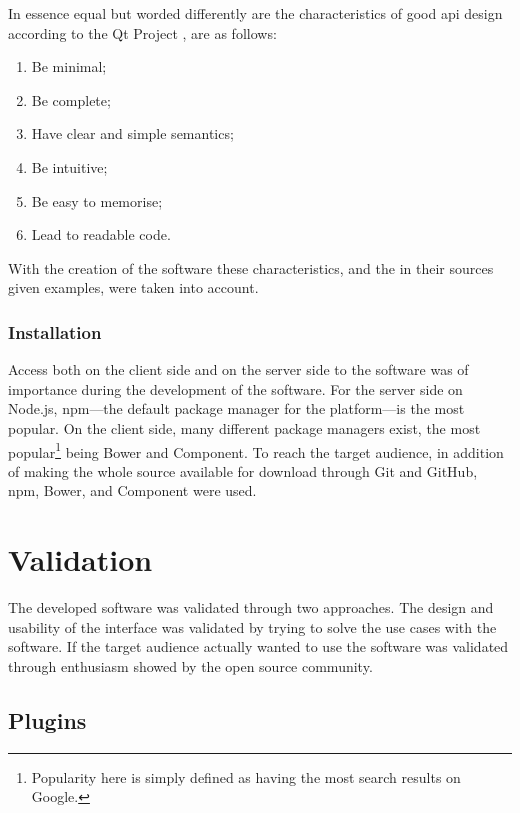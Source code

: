 \begin{enumerate}
In essence equal but worded differently are the characteristics of good
\gls{api} design according to the Qt Project
\autocite{qt-project.org-api-design-principles}, are as follows:

\begin{enumerate}
\item
  Be minimal;
\item
  Be complete;
\item
  Have clear and simple semantics;
\item
  Be intuitive;
\item
  Be easy to memorise;
\item
  Lead to readable code.
\end{enumerate}

With the creation of the software these characteristics, and the in
their sources given examples, were taken into account.

\subsection{Installation}\label{installation}

Access both on the client side and on the server side to the software
was of importance during the development of the software. For the server
side on Node.js, \gls{npm}---the default package manager for the platform---is
the most popular. On the client side, many different package managers
exist, the most popular\footnote{Popularity here is simply defined as
  having the most search results on Google.} being Bower and Component.
To reach the target audience, in addition of making the whole source
available for download through Git and GitHub, \gls{npm}, Bower, and Component
were used.

\chapter{Validation}\label{validation}

The developed software was validated through two approaches. The design
and usability of the interface was validated by trying to solve the use
cases with the software. If the target audience actually wanted to use
the software was validated through enthusiasm showed by the open source
community.

\section{Plugins}\label{plugins}


\end{enumerate}
